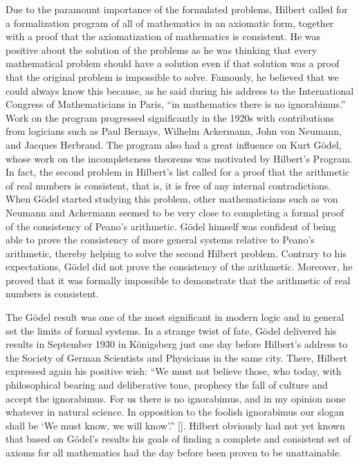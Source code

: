 Due to the paramount importance of the formulated problems, Hilbert called for a formalization program of all of mathematics in an axiomatic form, together with a proof that the axiomatization of mathematics is consistent. He was positive about the solution of the problems as he was thinking that every mathematical problem should have a solution even if that solution was a proof that the original problem is impossible to solve. Famously, he believed that we could always know this because, as he said during his address to the International Congress of Mathematicians in Paris, ``in mathematics there is no ignorabimus.'' Work on the program progressed significantly in the 1920s with contributions from logicians such as Paul Bernays, Wilhelm Ackermann, John von Neumann, and Jacques Herbrand. The program also had a great influence on Kurt G\"{o}del, whose work on the incompleteness theorems was motivated by Hilbert's Program. In fact, the second problem in Hilbert's list called for a proof that the arithmetic of real numbers is consistent, that is, it is free of any internal contradictions. When G\"{o}del started studying this problem, other mathematicians such as von Neumann and \hbox{Ackermann} seemed to be very close to completing a formal proof of the consistency of Peano's arithmetic. G\"{o}del himself was confident of being able to prove the consistency of more general systems relative to Peano's arithmetic, thereby helping to solve the second Hilbert problem. Contrary to his expectations, G\"{o}del did not prove the consistency of the arithmetic. Moreover, he proved that it was formally impossible to demonstrate that the arithmetic of real numbers is consistent.

The G\"{o}del result was one of the most significant in modern logic and in general set the limits of formal systems. In a strange twist of fate, G\"{o}del delivered his results in September 1930 in K\"{o}nigsberg just one day before Hilbert's address to the Society of German Scientists and Physicians in the same city. There, Hilbert expressed again his positive wish: ``We must not believe those, who today, with philosophical bearing and deliberative tone, prophesy the fall of culture and accept the ignorabimus. For us there is no ignorabimus, and in my opinion none whatever in natural science. In opposition to the foolish ignorabimus our slogan shall be `We must know, we will know'.'' [\citealt{chap:02:Smith:2014}]. Hilbert obviously had not yet known that based on G\"{o}del's results his goals of finding a complete and consistent set of axioms for all mathematics had the day before been proven to be unattainable.

